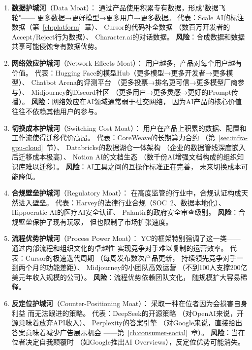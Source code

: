 \begin{keybox}[AI创业护城河类型学]
\begin{enumerate}
  \item \textbf{数据护城河}（Data Moat）：
    通过产品使用积累专有数据，形成"数据飞轮"——
    更多数据→更好模型→更多用户→更多数据。
    代表：Scale AI的标注数据（第~\ref{ch:platform}~章）、
    Cursor的代码补全数据
    （数百万开发者的Accept/Reject行为数据）、
    Character.ai的对话数据。
    \textbf{风险}：合成数据和数据共享可能侵蚀专有数据优势。

  \item \textbf{网络效应护城河}（Network Effects Moat）：
    用户越多，产品对每个用户越有价值。
    代表：Hugging Face的模型Hub（更多模型→更多开发者→更多模型）、
    Chatbot Arena的评测平台
    （更多投票→排名更可信→更多模型厂商参与）、
    Midjourney的Discord社区
    （更多用户→更多灵感→更好的Prompt传播）。
    \textbf{风险}：网络效应在AI领域通常弱于社交网络，
    因为AI产品的核心价值往往不依赖其他用户的参与。

  \item \textbf{切换成本护城河}（Switching Cost Moat）：
    用户在产品上积累的数据、配置和工作流使得迁移代价高昂。
    代表：CoreWeave的长期算力合约
    （第~\ref{sec:infra-gpu-cloud}~节）、
    Databricks的数据湖仓一体架构
    （企业的数据管线深度嵌入后迁移成本极高）、
    Notion AI的文档生态
    （数千份AI增强文档构成的组织知识库难以迁移）。
    \textbf{风险}：AI工具之间的互操作标准正在完善，
    未来切换成本可能降低。

  \item \textbf{合规壁垒护城河}（Regulatory Moat）：
    在高度监管的行业中，合规认证构成天然进入壁垒。
    代表：Harvey的法律行业合规（SOC~2、数据本地化）、
    Hippocratic AI的医疗AI安全认证、
    Palantir的政府安全审查级别。
    \textbf{风险}：合规壁垒保护了现有玩家，
    但也限制了市场扩张速度。

  \item \textbf{流程优势护城河}（Process Power Moat）：
    YC的框架特别强调了这一类——
    通过内部流程和组织文化的卓越性
    实现竞争对手难以复制的运营效率。
    代表：Cursor的极速迭代周期
    （每周发布数次产品更新，
    持续领先竞争对手一到两个月的功能差距）、
    Midjourney的小团队高效运营
    （不到100人支撑200亿美元年收入规模的公司）。
    \textbf{风险}：流程优势依赖团队文化，
    随规模扩大容易稀释。

  \item \textbf{反定位护城河}（Counter-Positioning Moat）：
    采取一种在位者因为会损害自身利益
    而无法跟进的策略。
    代表：DeepSeek的开源策略
    （对OpenAI来说，开源意味着放弃API收入）、
    Perplexity的答案引擎
    （对Google来说，直接给出答案意味着减少广告展示机会
    ——第~\ref{ch:consumer-social}~章）。
    \textbf{风险}：当在位者决定自我颠覆时
    （如Google推出AI Overviews），反定位优势可能消失。
\end{enumerate}
\end{keybox}


